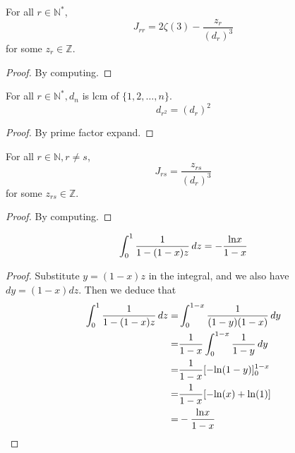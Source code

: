 \begin{lemma}\label{Jrr_linear_form}
    For all $r \in \mathbb{N}^*$,
    \[ J_{rr} = 2 \zeta(3) - \frac{z_r}{(d_r)^3} \]
    for some $z_r \in \mathbb{Z}$.
\end{lemma}
\begin{proof}
    \leanok
    By computing.
\end{proof}

\begin{lemma}\label{d_r_2}
    For all $r \in \mathbb{N}^*, d_n$ is lcm of $\{1, 2, \ldots, n\}.$ 
    \[ d_{r^2} = (d_r)^2 \]
\end{lemma}
\begin{proof}
    \leanok
    By prime factor expand.
\end{proof}

\begin{lemma}\label{Jrs_postive_rational}
    For all $r \in \mathbb{N}, r \neq s$,
    \[ J_{rs} = \frac{z_{rs}}{(d_r)^3}\]
    for some $z_{rs} \in \mathbb{Z}$.
\end{lemma}
\begin{proof}
    \leanok
    By computing.
\end{proof}

\begin{lemma}\label{integral1}
    \[ \int_{0}^{1} \frac{1}{1 - (1 - x)z} \, dz= -\frac{{\rm ln}x}{1 - x} \]
\end{lemma}
\begin{proof}
    \leanok
    Substitute $y = (1 - x)z$ in the integral, and we also have $dy = (1-x)dz$. Then we deduce that
    \begin{align*}
        \int_{0}^{1} \frac{1}{1 - (1 - x)z} \, dz =& \int_{0}^{1-x} \frac{1}{(1 - y)(1-x)} \, dy \\
        =&\frac{1}{1-x}\int_{0}^{1-x} \frac{1}{1 - y} \, dy\\
        =&\frac{1}{1-x}[-{\rm ln}(1-y)]_0^{1-x} \\
        =&\frac{1}{1-x}[-{\rm ln}(x) + {\rm ln}(1)] \\
        =&-\frac{{\rm ln}x}{1 - x}
    \end{align*}
\end{proof}

